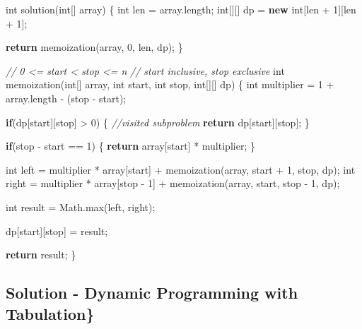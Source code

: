 \documentclass[]{book}
\newenvironment{Shaded}{\begin{snugshade}}{\end{snugshade}}
\newcommand{\BuiltInTok}[1]{#1}
\newcommand{\CommentTok}[1]{\textcolor[rgb]{0.56,0.35,0.01}{\textit{#1}}}
\newcommand{\DataTypeTok}[1]{\textcolor[rgb]{0.13,0.29,0.53}{#1}}
\newcommand{\DecValTok}[1]{\textcolor[rgb]{0.00,0.00,0.81}{#1}}
\newcommand{\FunctionTok}[1]{\textcolor[rgb]{0.00,0.00,0.00}{#1}}
\newcommand{\KeywordTok}[1]{\textcolor[rgb]{0.13,0.29,0.53}{\textbf{#1}}}
\newcommand{\NormalTok}[1]{#1}
\begin{document}
\begin{Shaded}
\begin{Highlighting}[]
\DataTypeTok{int} \FunctionTok{solution}\NormalTok{(}\DataTypeTok{int}\NormalTok{[] array) \{}
    \DataTypeTok{int}\NormalTok{ len = array.}\FunctionTok{length}\NormalTok{;}
    \DataTypeTok{int}\NormalTok{[][] dp = }\KeywordTok{new} \DataTypeTok{int}\NormalTok{[len + }\DecValTok{1}\NormalTok{][len + }\DecValTok{1}\NormalTok{];}

    \KeywordTok{return} \FunctionTok{memoization}\NormalTok{(array, }\DecValTok{0}\NormalTok{, len, dp);}
\NormalTok{\}}

\CommentTok{// 0 <= start < stop <= n}
\CommentTok{// start inclusive, stop exclusive}
\DataTypeTok{int} \FunctionTok{memoization}\NormalTok{(}\DataTypeTok{int}\NormalTok{[] array, }\DataTypeTok{int}\NormalTok{ start, }\DataTypeTok{int}\NormalTok{ stop, }\DataTypeTok{int}\NormalTok{[][] dp) \{}
    \DataTypeTok{int}\NormalTok{ multiplier = }\DecValTok{1}\NormalTok{ + array.}\FunctionTok{length}\NormalTok{ - (stop - start);}

    \KeywordTok{if}\NormalTok{(dp[start][stop] > }\DecValTok{0}\NormalTok{) \{}
        \CommentTok{//visited subproblem}
        \KeywordTok{return}\NormalTok{ dp[start][stop];}
\NormalTok{    \}}

    \KeywordTok{if}\NormalTok{(stop - start == }\DecValTok{1}\NormalTok{) \{}
        \KeywordTok{return}\NormalTok{ array[start] * multiplier;}
\NormalTok{    \}}

    \DataTypeTok{int}\NormalTok{ left = multiplier * array[start] + }\FunctionTok{memoization}\NormalTok{(array, start + }\DecValTok{1}\NormalTok{, stop, dp);}
    \DataTypeTok{int}\NormalTok{ right = multiplier * array[stop - }\DecValTok{1}\NormalTok{] + }\FunctionTok{memoization}\NormalTok{(array, start, stop - }\DecValTok{1}\NormalTok{, dp);}

    \DataTypeTok{int}\NormalTok{ result = }\BuiltInTok{Math}\NormalTok{.}\FunctionTok{max}\NormalTok{(left, right);}

\NormalTok{    dp[start][stop] = result;}

    \KeywordTok{return}\NormalTok{ result;}
\NormalTok{\}}
\end{Highlighting}
\end{Shaded}

\hypertarget{solution---dynamic-programming-with-tabulation}{%
\subsection{Solution - Dynamic Programming with Tabulation\}}\label{solution---dynamic-programming-with-tabulation}}
\end{document}
